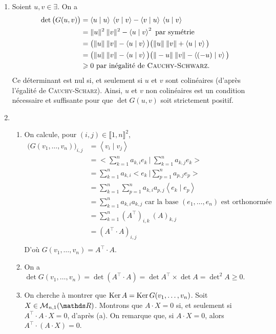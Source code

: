 \documentclass[a4paper]{article}
\begin{document}
	\begin{enumerate}
		\item Soient $u,v \in \exists $. On a
			\begin{align*}
				\det\big(G(u,v)\big) &= \left<u \mid u \right>\:\left<v \mid v \right> - \left<v \mid u \right>\:\left<u \mid v \right>\\
				&= \|u\|^2\:\|v\|^2 - \left<u \mid v \right>^2 \text{ par symétrie }\\
				&= \big(\|u\|\:\|v\| - \left<u \mid v \right>\big)
				\big(\|u\|\:\|v\| + \left<u \mid v \right>\big)\\
				&= \big(\|u\|\:\|v\| - \left<u \mid v \right>\big)
				\big(\|-u\|\:\|v\| - \left<(-u) \mid v \right>\big)\\
				&\ge 0 \text{ par inégalité de \textsc{Cauchy-Schwarz}}.
			\end{align*}
			Ce déterminant est nul si, et seulement si $u$\/ et $v$\/ sont colinéaires (d'après l'égalité de \textsc{Cauchy-Scharz}). Ainsi, $u$\/ et $v$\/ non colinéaires est un condition nécessaire et suffisante pour que $\det G(u,v)$\/ soit strictement positif.
		\item
			\begin{enumerate}
				\item On calcule, pour $(i,j) \in \llbracket 1,n \rrbracket^2$,
					\begin{align*}
						\big(G(v_1,\ldots,v_n)\big)_{i,j} &= \left<v_i  \mid v_j \right>\\
																							&= \Big< \sum_{k=1}^n a_{k,i} e_k \:\Big|\: \sum_{k=1}^n a_{k,j} e_k\Big>\\
						&= \sum_{k=1}^n a_{k,i}\Big<e_k \:\Big|\sum_{p=1}^n a_{p,j} e_p \Big> \\
						&= \sum_{k=1}^n \sum_{p=1}^n a_{k,i} a_{p,j} \left<e_k  \mid e_p \right>  \\
						&= \sum_{k=1}^n a_{k,i} a_{k,j} \text{ car la base } (e_1,\ldots,e_n)  \text{ est orthonormée }\\
						&= \sum_{k=1}^n (A^\top)_{i,k}\:(A)_{k,j} \\
						&= (A^\top \cdot A)_{i,j} \\
					\end{align*}
					D'où $G(v_1,\ldots,v_n) = A^\top \cdot A$.
				\item On a $\det G(v_1,\ldots,v_n) = \det (A^\top \cdot A) = \det A^\top \times \det A = \det^2 A \ge 0$.
				\item On cherche à montrer que $\Ker A = \Ker G(v_1, \ldots, v_n)$. Soit $X \in \mathcal{M}_{n,1}(\R)$. Montrons que $A\cdot X = 0$\/ si, et seulement si $A^\top \cdot A\cdot X = 0$, d'après (a). On remarque que, si $A\cdot X = 0$, alors $A^\top \cdot (A\cdot X) = 0$.

\end{enumerate}
\end{enumerate}
\end{document}
